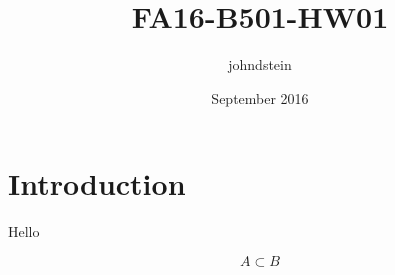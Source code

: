 \documentclass{article}
\title{FA16-B501-HW01}
\author{johndstein }
\date{September 2016}
\begin{document}
\maketitle

\section{Introduction}

Hello

$$ A \subset B $$

\begin{tikzpicture}



\end{tikzpicture}
\end{document}
